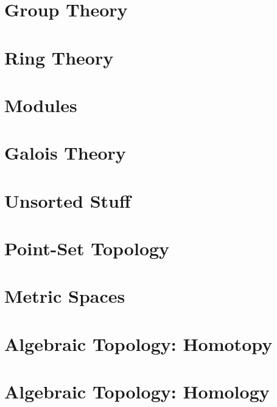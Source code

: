 \documentclass[oneside]{book}                                                  %
\newcommand*{\TOPPATH}{books}
\newcommand*{\PATH}{\TOPPATH/}
\newcounter{endpage}
\begin{document}
        \part{Group Theory}
            
        \part{Ring Theory}
            
        \part{Modules}
           
        \part{Galois Theory}
            
        \part{Unsorted Stuff}
            
            
            
            
    \clearpage

    \setcounter{endpage}{\thepage}
        \label{book:Topology}%
        \renewcommand{\PATH}{\TOPPATH/Topology}
        \setcounter{page}{\value{endpage}}
        \part{Point-Set Topology}
            
        \part{Metric Spaces}
        \part{Algebraic Topology: Homotopy}
            
        \part{Algebraic Topology: Homology}
\end{document}
